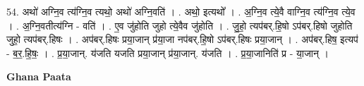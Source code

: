 \documentclass[17pt]{extarticle}
\begin{document}
54. अथो॑ अग्नि॒व त्य॑ग्नि॒व त्यथो॒ अथो॑ अग्नि॒वति॑ । . अथो॒ इत्यथो᳚ । . अ॒ग्नि॒व त्ये॒वै वाग्नि॒व त्य॑ग्नि॒व त्ये॒व । . अ॒ग्नि॒वतीत्य॑ग्नि - वति॑ । . ए॒व जु॑होति जुहो त्ये॒वैव जु॑होति । . जु॒हो॒ त्यप॑बर्.हि॒षो ऽप॑बर्.हिषो जुहोति जुहो॒ त्यप॑बर्.हिषः । . अप॑बर्.हिषः प्रया॒जान् प्र॑या॒जा नप॑बर्.हि॒षो ऽप॑बर्.हिषः प्रया॒जान् । . अप॑बर्.हिष॒ इत्यप॑ - ब॒र॒.हि॒षः॒ । . प्र॒या॒जान्. य॑जति यजति प्रया॒जान् प्र॑या॒जान्. य॑जति । . प्र॒या॒जानिति॑ प्र - या॒जान् । \newline

\textbf{Ghana Paata } \newline
\end{document}
